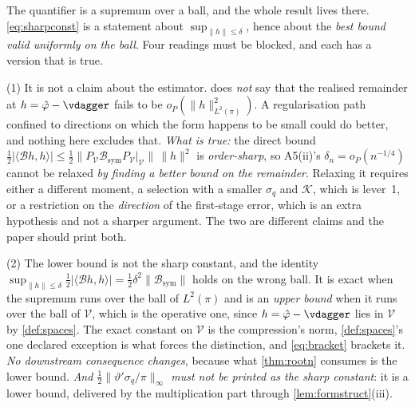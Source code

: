 \begin{remark}\label{rem:sharpscope}
The quantifier is a supremum over a ball, and the whole result lives there.
\eqref{eq:sharpconst} is a statement about $\sup_{\|h\|\le\delta}$, hence about the \emph{best bound
valid uniformly on the ball}. Four readings must be blocked, and each has a version that is true.

\textup{(1)} It is not a claim about the estimator.  does \emph{not} say that
the realised remainder at $h=\hat\varphi-\vdagger$ fails to be $o_P(\|h\|^{2}_{L^{2}(\pi)})$. A
regularisation path confined to directions on which the form happens to be small could do better, and
nothing here excludes that. \emph{What is true:} the direct bound
$\tfrac12|\langle\mathcal Bh,h\rangle|\le\tfrac12\|P_{\mathcal V}\mathcal B_{\mathrm{sym}}P_{\mathcal V}|_{\mathcal V}\|\,\|h\|^{2}$
is \emph{order-sharp}, so A5(ii)'s $\delta_n=o_P(n^{-1/4})$ cannot be relaxed \emph{by finding a better
bound on the remainder}. Relaxing it requires either a different moment, a selection with a smaller
$\sigma_q$ and $\mathcal K$, which is lever~1, or a restriction on the \emph{direction} of the
first-stage error, which is an extra hypothesis and not a sharper argument. The two are different claims
and the paper should print both.

\textup{(2)} The lower bound is not the sharp constant, and the identity
$\sup_{\|h\|\le\delta}\tfrac12|\langle\mathcal Bh,h\rangle|=\tfrac12\delta^{2}\|\mathcal B_{\mathrm{sym}}\|$
holds on the wrong ball. It is exact when the
supremum runs over the ball of $L^{2}(\pi)$ and is an \emph{upper bound} when it runs over the ball of
$\mathcal V$, which is the operative one, since $h=\hat\varphi-\vdagger$ lies in $\mathcal V$ by
\cref{def:spaces}. The exact constant on $\mathcal V$ is the compression's norm, \cref{def:spaces}'s
one declared exception is what forces the distinction, and \eqref{eq:bracket} brackets it. \emph{No
downstream consequence changes}, because what \cref{thm:rootn} consumes is the lower bound.
\emph{And $\tfrac12\|\vartheta'\sigma_q/\pi\|_\infty$ must not be printed as the sharp constant}: it is a
lower bound, delivered by the multiplication part through \cref{lem:formstruct}(iii).


\end{remark}
